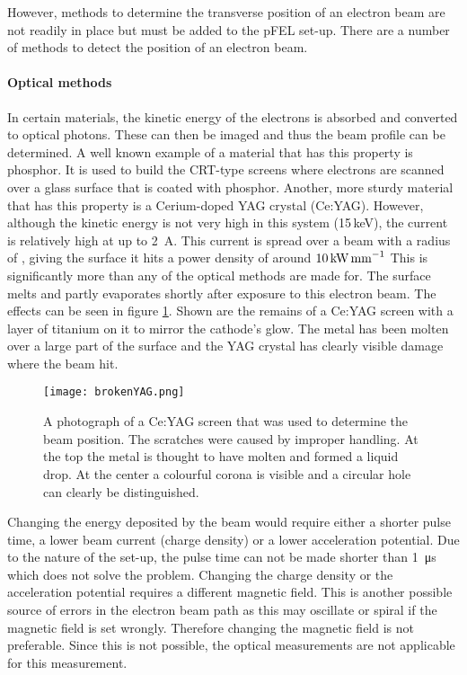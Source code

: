 However, methods to determine the transverse position of an electron beam are not readily in place but must be added to the pFEL set-up. 
There are a number of methods to detect the position of an electron beam.

\paragraph{Optical methods}
In certain materials, the kinetic energy of the electrons is absorbed and converted to optical photons.  These can then be imaged and thus the beam profile can be determined. A well known example of a material that has this property is phosphor. It is used to build the CRT-type screens where electrons are scanned over a glass surface that is coated with phosphor.
Another, more sturdy material that has this property is a Cerium-doped YAG crystal (Ce:YAG). 
However, although the kinetic energy is not very high in this system (15\,keV), the current is relatively high at up to \SI{2}{\ampere}. This current is spread over a beam with a radius of , giving the surface it hits a power density of around $10\,\text{kW\,mm}^{-1}$
This is significantly more than any of the optical methods are made for. The surface melts and partly evaporates shortly after exposure to this electron beam. 
The effects can be seen in figure \ref{fig:brokenyag}. Shown are the remains of a Ce:YAG screen with a layer of titanium on it to mirror the cathode's glow. The metal has been molten over a large part of the surface and the YAG crystal has clearly visible damage where the beam hit. 
\begin{figure}[h]
 \centering
 \texttt{[image: brokenYAG.png]}
 \caption{A photograph of a Ce:YAG screen that was used to determine the beam position. The scratches were caused by improper handling. At the top the metal is thought to have molten and formed a liquid drop. At the center a colourful corona is visible and a circular hole can clearly be distinguished.}
 \label{fig:brokenyag}
\end{figure}

Changing the energy deposited by the beam would require either a shorter pulse time, a lower beam current (charge density) or a lower acceleration potential.
Due to the nature of the set-up, the pulse time can not be made shorter than \SI{1}{\micro\second} which does not solve the problem. Changing the charge density or the acceleration potential requires a different magnetic field. 
This is another possible source of errors in the electron beam path as this may oscillate or spiral if the magnetic field is set wrongly. Therefore changing the magnetic field is not preferable.
Since this is not possible, the optical measurements are not applicable for this measurement.

